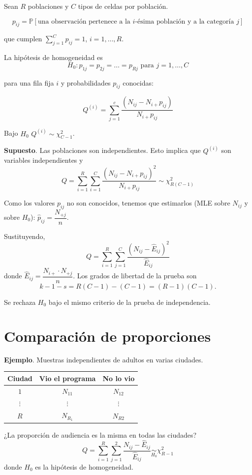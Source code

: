\documentclass[
  12pt,
]{book}
\begin{document}
Sean \(R\) poblaciones y \(C\) tipos de celdas por población.

\[p_{ij} = \mathbb P[\text{una observación pertenece a la }i\text{-ésima población y a la categoría }j]\]

que cumplen \(\sum_{j=1}^Cp_{ij} = 1\), \(i=1,\dots,R\).

La hipótesis de homogeneidad es
\[H_0: p_{1j} = p_{2j} = \dots = p_{Rj} \text{ para }j=1,\dots, C\]

para una fila fija \(i\) y probabilidades \(p_{ij}\) conocidas:

\[Q^{(i)}=\sum_{j=1}^c\dfrac{(N_{ij}-N_{i+}p_{ij})}{N_{i+}p_{ij}}\]

Bajo \(H_0\) \(Q^{(i)}\sim \chi^2_{C-1}\).

\textbf{Supuesto}. Las poblaciones son independientes. Esto implica que \(Q^{(i)}\) son variables independientes y
\[Q = \sum_{i=1}^R\sum_{i=1}^C\dfrac{(N_{ij}-N_{i+}p_{ij})^2}{N_{i+}p_{ij}}\sim \chi^2_{R(C-1)}\]

Como los valores \(p_{ij}\) no son conocidos, tenemos que estimarlos (MLE sobre \(N_{ij}\) y sobre \(H_0\)): \(\hat p_{ij} = \dfrac{N_{+j}}{n}\).

Sustituyendo,
\[Q = \sum_{i=1}^R\sum_{j=1}^C\dfrac{(N_{ij}-\hat E_{ij})^2}{\hat E_{ij}}\]
donde \(\hat E_{ij} = \dfrac{N_{i+}\cdot N_{+j}}{n}\). Los grados de libertad de la prueba son
\[k-1-s = R(C-1)-(C-1) = (R-1)(C-1).\]

Se rechaza \(H_0\) bajo el mismo criterio de la prueba de independencia.

\hypertarget{comparaciuxf3n-de-proporciones}{%
\section{Comparación de proporciones}\label{comparaciuxf3n-de-proporciones}}

\textbf{Ejemplo}. Muestras independientes de adultos en varias ciudades.

\begin{longtable}[]{@{}ccc@{}}
\toprule
Ciudad & Vio el programa & No lo vio\tabularnewline
\midrule
\endhead
\(1\) & \(N_{11}\) & \(N_{12}\)\tabularnewline
\(\vdots\) & \(\vdots\) & \(\vdots\)\tabularnewline
\(R\) & \(N_{R_1}\) & \(N_{R2}\)\tabularnewline
\bottomrule
\end{longtable}

¿La proporción de audiencia es la misma en todas las ciudades?
\[Q = \sum_{i=1}^R\sum_{j=1}^2\dfrac{N_{ij}-\hat E_{ij}}{\hat E_{ij}}\underset{H_0}\sim \chi^2_{R-1}\]
donde \(H_0\) es la hipótesis de homogeneidad.
\end{document}
